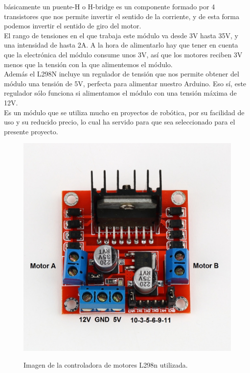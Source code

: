 básicamente un puente-H o H-bridge es un componente formado por 4 transistores que nos permite invertir el sentido de la corriente, y de esta forma podemos 
invertir el sentido de giro del motor.\\

El rango de tensiones en el que trabaja este módulo va desde 3V hasta 35V, y una intensidad de hasta 2A. A la hora de alimentarlo hay que tener en cuenta que la 
electrónica del módulo consume unos 3V, así que los motores reciben 3V menos que la tensión con la que alimentemos el módulo.\\

Además el L298N incluye un regulador de tensión que nos permite obtener del módulo una tensión de 5V, perfecta para alimentar nuestro Arduino. Eso sí, este regulador sólo 
funciona si alimentamos el módulo con una tensión máxima de 12V.\\

Es un módulo que se utiliza mucho en proyectos de robótica, por su facilidad de uso y su reducido precio, lo cual ha servido para que sea seleccionado para el presente proyecto.

\begin{figure}[H]
  \begin{center}
    \includegraphics[scale=0.8]{imagenes/l298n.jpg}\\
    \caption{Imagen de la controladora de motores L298n utilizada.}
  \end{center}
\end{figure}



